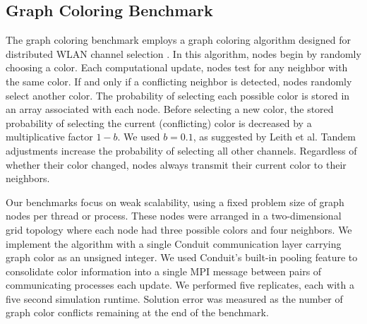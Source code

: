 \subsection{ Graph Coloring Benchmark } \label{sec:graph-coloring-benchmark}

The graph coloring benchmark employs a graph coloring algorithm designed for distributed WLAN channel selection \cite{leith2012wlan}.
In this algorithm, nodes begin by randomly choosing a color.
Each computational update, nodes test for any neighbor with the same color.
If and only if a conflicting neighbor is detected, nodes randomly select another color.
The probability of selecting each possible color is stored in an array associated with each node.
Before selecting a new color, the stored probability of selecting the current (conflicting) color is decreased by a multiplicative factor $1 - b$.
We used $b=0.1$, as suggested by Leith et al.
Tandem adjustments increase the probability of selecting all other channels.
Regardless of whether their color changed, nodes always transmit their current color to their neighbors.

Our benchmarks focus on weak scalability, using a fixed problem size of  graph nodes per thread or process.
These nodes were arranged in a two-dimensional grid topology where each node had three possible colors and four neighbors.
We implement the algorithm with a single Conduit communication layer carrying graph color as an unsigned integer.
We used Conduit's built-in pooling feature to consolidate color information into a single MPI message between pairs of communicating processes each update.
We performed five replicates, each with a five second simulation runtime.
Solution error was measured as the number of graph color conflicts remaining at the end of the benchmark.
